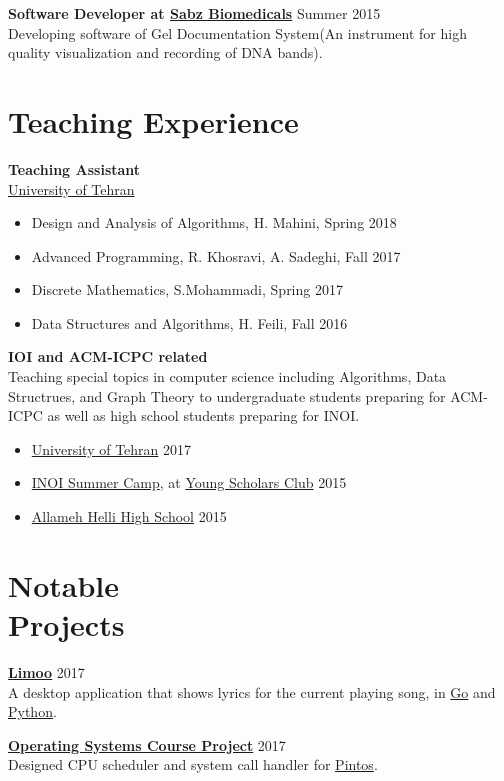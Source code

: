 \documentclass[margin]{res}
\begin{document}
\begin{resume}
    {\bf Software Developer at \href{http://www.sabzgroup.com/}{Sabz Biomedicals}} \hfill Summer 2015
    \\Developing software of Gel Documentation System(An instrument for  high quality visualization and recording of DNA bands).

\section{Teaching Experience}
	{\bf Teaching Assistant}
	\\\href{http://ut.ac.ir/en}{University of Tehran}
	\begin{itemize}
		\item Design and Analysis of Algorithms, H. Mahini, Spring 2018
		\item Advanced Programming, R. Khosravi, A. Sadeghi, Fall 2017
		\item Discrete Mathematics, S.Mohammadi, Spring 2017
		\item Data Structures and Algorithms, H. Feili, Fall 2016
	\end{itemize}

    {\bf IOI and ACM-ICPC related}
    \\Teaching special topics in computer science including Algorithms, Data Structrues,
    and Graph Theory to undergraduate students preparing for ACM-ICPC as well as high school
    students preparing for INOI.
    	\begin{itemize}
		\item \href{http://ut.ac.ir/en}{University of Tehran} \hfill 2017
		\item \href{http://inoi.ir/}{INOI Summer Camp}, at \href{http://ysc.ac.ir/}{Young Scholars Club} \hfill 2015
	    \item \href{http://www.helli.ir/}{Allameh Helli High School} \hfill 2015
	\end{itemize}

\section{Notable \\ Projects}
	{\bf \href{https://github.com/shayanh/limoo}{Limoo}} \hfill 2017
	\\A desktop application that shows lyrics for the current playing song, in \href{https://github.com/shayanh/limoo-server}{Go} and \href{https://github.com/shayanh/limoo}{Python}.
	
	{\bf \href{https://github.com/shayanh/pintos}{Operating Systems Course Project}} \hfill 2017
	\\Designed CPU scheduler and system call handler for \href{https://en.wikipedia.org/wiki/Pintos}{Pintos}.
	

\end{resume}
\end{document}
